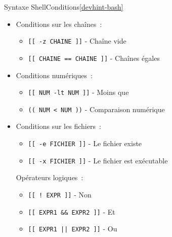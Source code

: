 \documentclass{beamer}
\begin{document}
    \begin{frame}{Syntaxe Shell}{Conditions\cref{devhint-bash}}
        \begin{itemize}
            \item Conditions sur les chaînes~:
            \begin{itemize}
                \item \lstinline{[[ -z CHAINE ]]} - Chaîne vide
                \item \lstinline{[[ CHAINE == CHAINE ]]} - Chaînes égales
            \end{itemize}
            \item Conditions numériques~:
            \begin{itemize}
                \item \lstinline{[[ NUM -lt NUM ]]} - Moins que
                \item \lstinline{(( NUM < NUM ))} - Comparaison numérique
            \end{itemize}
            \item Conditions sur les fichiers~:
            \begin{itemize}
                \item \lstinline{[[ -e FICHIER ]]} - Le fichier existe
                \item \lstinline{[[ -x FICHIER ]]} - Le fichier est exécutable
            \end{itemize}
            Opérateurs logiques~:
            \begin{itemize}
                \item \lstinline{[[ ! EXPR ]]} - Non
                \item \lstinline{[[ EXPR1 && EXPR2 ]]} - Et
                \item \lstinline{[[ EXPR1 || EXPR2 ]]} - Ou
            \end{itemize}
        \end{itemize}
    \end{frame}
\end{document}
